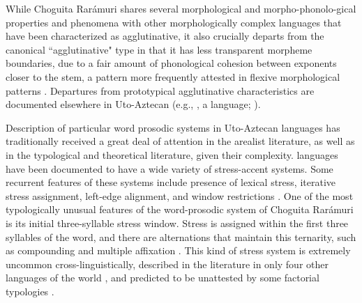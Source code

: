 \z

While Choguita Rarámuri shares several morphological and morpho-phonol\-o-gic\-al properties and phenomena with other morphologically complex languages that have been characterized as agglutinative, it also crucially departs from the canonical ``agglutinative" type in that it has less transparent morpheme boundaries, due to a fair amount of phonological cohesion between exponents closer to the stem, a pattern more frequently attested in flexive morphological patterns \citep{caballero2008choguita,kapatsinski2021agglutinative}. Departures from prototypical agglutinative characteristics are documented elsewhere in {Uto-Aztecan} (e.g., , a  language; \citealt{hill2005grammar}).

Description of particular word prosodic systems in {Uto-Aztecan} languages has traditionally received a great deal of attention in the arealist literature, as well as in the typological and theoretical literature, given their complexity.  languages have been documented to have a wide variety of stress-accent systems. Some recurrent features of these systems include presence of lexical stress, iterative stress assignment, left-edge alignment, and window restrictions \citep{munro1977towards}. One of the most typologically unusual features of the word-prosodic system of Choguita Rarámuri is its initial three-syllable stress window. Stress is assigned within the first three syllables of the word, and there are alternations that maintain this ternarity, such as compounding and multiple affixation \citep{caballero2008choguita,caballero2011morphologically}. This kind of stress system is extremely uncommon cross-linguistically, described in the literature in only four other languages of the world \citep{kager2012stress}, and predicted to be unattested by some factorial typologies \citep{elenbaas1999ternary}.



